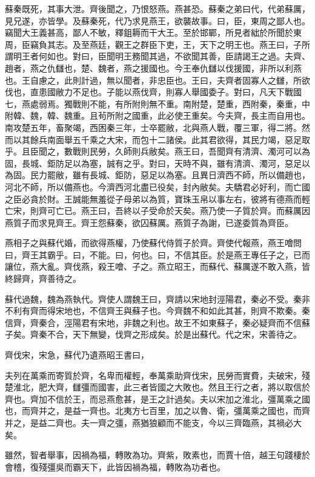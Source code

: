 蘇秦既死，其事大泄。齊後聞之，乃恨怒燕。燕甚恐。蘇秦之弟曰代，代弟蘇厲，見兄遂，亦皆學。及蘇秦死，代乃求見燕王，欲襲故事。曰，臣，東周之鄙人也。竊聞大王義甚高，鄙人不敏，釋鉏耨而干大王。至於邯鄲，所見者絀於所聞於東周，臣竊負其志。及至燕廷，觀王之群臣下吏，王，天下之明王也。燕王曰，子所謂明王者何如也。對曰，臣聞明王務聞其過，不欲聞其善，臣請謁王之過。夫齊、趙者，燕之仇讎也，楚、魏者，燕之援國也。今王奉仇讎以伐援國，非所以利燕也。王自慮之，此則計過，無以聞者，非忠臣也。王曰，夫齊者固寡人之讎，所欲伐也，直患國敝力不足也。子能以燕伐齊，則寡人舉國委子。對曰，凡天下戰國七，燕處弱焉。獨戰則不能，有所附則無不重。南附楚，楚重，西附秦，秦重，中附韓、魏，韓、魏重。且茍所附之國重，此必使王重矣。今夫齊，長主而自用也。南攻楚五年，畜聚竭，西困秦三年，士卒罷敝，北與燕人戰，覆三軍，得二將。然而以其餘兵南面舉五千乘之大宋，而包十二諸侯。此其君欲得，其民力竭，惡足取乎。且臣聞之，數戰則民勞，久師則兵敝矣。燕王曰，吾聞齊有清濟、濁河可以為固，長城、鉅防足以為塞，誠有之乎。對曰，天時不與，雖有清濟、濁河，惡足以為固。民力罷敝，雖有長城、鉅防，惡足以為塞。且異日濟西不師，所以備趙也，河北不師，所以備燕也。今濟西河北盡已役矣，封內敝矣。夫驕君必好利，而亡國之臣必貪於財。王誠能無羞從子母弟以為質，寶珠玉帛以事左右，彼將有德燕而輕亡宋，則齊可亡已。燕王曰，吾終以子受命於天矣。燕乃使一子質於齊。而蘇厲因燕質子而求見齊王。齊王怨蘇秦，欲囚蘇厲。燕質子為謝，已遂委質為齊臣。

燕相子之與蘇代婚，而欲得燕權，乃使蘇代侍質子於齊。齊使代報燕，燕王噲問曰，齊王其霸乎。曰，不能。曰，何也。曰，不信其臣。於是燕王專任子之，已而讓位，燕大亂。齊伐燕，殺王噲、子之。燕立昭王，而蘇代、蘇厲遂不敢入燕，皆終歸齊，齊善待之。

蘇代過魏，魏為燕執代。齊使人謂魏王曰，齊請以宋地封涇陽君，秦必不受。秦非不利有齊而得宋地也，不信齊王與蘇子也。今齊魏不和如此其甚，則齊不欺秦。秦信齊，齊秦合，涇陽君有宋地，非魏之利也。故王不如東蘇子，秦必疑齊而不信蘇子矣。齊秦不合，天下無變，伐齊之形成矣。於是出蘇代。代之宋，宋善待之。

齊伐宋，宋急，蘇代乃遺燕昭王書曰，

夫列在萬乘而寄質於齊，名卑而權輕，奉萬乘助齊伐宋，民勞而實費，夫破宋，殘楚淮北，肥大齊，讎彊而國害，此三者皆國之大敗也。然且王行之者，將以取信於齊也。齊加不信於王，而忌燕愈甚，是王之計過矣。夫以宋加之淮北，彊萬乘之國也，而齊并之，是益一齊也。北夷方七百里，加之以魯、衛，彊萬乘之國也，而齊并之，是益二齊也。夫一齊之彊，燕猶狼顧而不能支，今以三齊臨燕，其禍必大矣。

雖然，智者舉事，因禍為福，轉敗為功。齊紫，敗素也，而賈十倍，越王句踐棲於會稽，復殘彊吳而霸天下，此皆因禍為福，轉敗為功者也。

